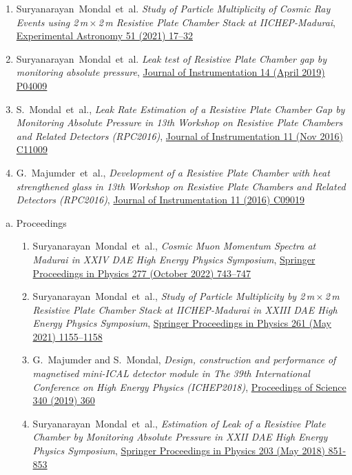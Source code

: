 \documentclass[12pt]{article}
\begin{document}
\begin{justify}
\begin{enumerate}[a.]
\begin{enumerate}[1.]
  \item Suryanarayan~Mondal~et~al. \emph{Study of Particle Multiplicity of Cosmic Ray Events using 2\,m\,$\times$\,2\,m Resistive Plate Chamber Stack at IICHEP-Madurai}, \href{https://doi.org/10.1007/s10686-020-09685-6}{Experimental Astronomy 51 (2021) 17--32}
  \item Suryanarayan~Mondal~et~al. \emph{Leak test of Resistive Plate Chamber gap by monitoring absolute pressure}, \href{https://doi.org/10.1088/1748-0221/14/04/P04009}{Journal of Instrumentation 14 (April 2019) P04009}
  \item S.~Mondal~et~al., \emph{Leak Rate Estimation of a Resistive Plate Chamber Gap by Monitoring Absolute Pressure in 13th Workshop on Resistive Plate Chambers and Related Detectors (RPC2016)}, \href{https://doi.org/10.1088/1748-0221/11/11/C11009}{Journal of Instrumentation 11 (Nov 2016) C11009}
  \item  G.~Majumder~et~al., \emph{Development of a Resistive Plate Chamber with heat strengthened glass in 13th Workshop on Resistive Plate Chambers and Related Detectors (RPC2016)}, \href{https://doi.org/10.1088/1748-0221/11/09/C09019}{Journal of Instrumentation 11 (2016) C09019}
  \end{enumerate} 
\end{enumerate} 
\begin{enumerate}[b.]
\item Proceedings
  \begin{enumerate}[1.]
  \item Suryanarayan~Mondal~et~al., \emph{Cosmic Muon Momentum Spectra at Madurai in XXIV DAE High Energy Physics Symposium}, \href{https://doi.org/10.1007/978-981-19-2354-8_134}{Springer Proceedings in Physics 277 (October 2022) 743--747}
  \item Suryanarayan~Mondal~et~al., \emph{Study of Particle Multiplicity by 2\,m\,$\times$\,2\,m Resistive Plate Chamber Stack at IICHEP-Madurai in XXIII DAE High Energy Physics Symposium}, \href{https://doi.org/10.1007/978-981-33-4408-2_172}{Springer Proceedings in Physics 261 (May 2021) 1155--1158}
  \item G.~Majumder and S.~Mondal, \emph{Design, construction and performance of magnetised mini-ICAL detector module in The 39th International Conference on High Energy Physics (ICHEP2018)}, \href{https://doi.org/10.22323/1.340.0360}{Proceedings of Science 340 (2019) 360}
  \item Suryanarayan~Mondal~et~al., \emph{Estimation of Leak of a Resistive Plate Chamber by Monitoring Absolute Pressure in XXII DAE High Energy Physics Symposium}, \href{https://doi.org/10.1007/978-3-319-73171-1_207}{Springer Proceedings in Physics 203 (May 2018) 851-853}

\end{enumerate}
\end{enumerate}
\end{justify}
\end{document}
